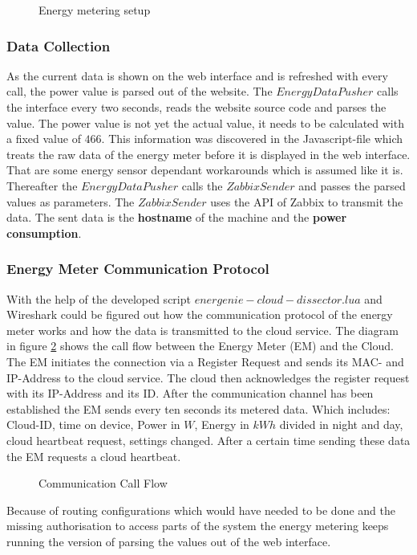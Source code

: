 \begin{figure}
	\centering
	\def\svgwidth{\columnwidth}
	
	\caption{Energy metering setup}
	\label{fig:energyMeteringSetup}
\end{figure}

\subsubsection{Data Collection}
As the current data is shown on the web interface and is refreshed with every call, the power value is parsed out of the website. The $ EnergyDataPusher $ calls the interface every two seconds, reads the website source code and parses the value. The power value is not yet the actual value, it needs to be calculated with a fixed value of $ 466 $. This information was discovered in the Javascript-file which treats the raw data of the energy meter before it is displayed in the web interface. That are some energy sensor dependant workarounds which is assumed like it is. Thereafter the $ EnergyDataPusher $ calls the $ ZabbixSender $ and passes the parsed values as parameters. The $ ZabbixSender $ uses the API of Zabbix to transmit the data. The sent data is the \textbf{hostname} of the machine and the \textbf{power consumption}.

\subsubsection{Energy Meter Communication Protocol}
With the help of the developed script $ energenie-cloud-dissector.lua $ and Wireshark could be figured out how the communication protocol of the energy meter works and how the data is transmitted to the cloud service. The diagram in figure \ref{fig:energyCommunicationProtocol} shows the call flow between the Energy Meter (EM) and the Cloud. The EM initiates the connection via a Register Request and sends its MAC- and IP-Address to the cloud service. The cloud then acknowledges the register request with its IP-Address and its ID. After the communication channel has been established the EM sends every ten seconds its metered data. Which includes: Cloud-ID, time on device, Power in $ W $, Energy in $ kWh $ divided in night and day, cloud heartbeat request, settings changed. After a certain time sending these data the EM requests a cloud heartbeat.

\begin{figure}
	\centering
	\def\svgwidth{\columnwidth}
	
	\caption{Communication Call Flow}
	\label{fig:energyCommunicationProtocol}
\end{figure}

Because of routing configurations which would have needed to be done and the missing authorisation to access parts of the system the energy metering keeps running the version of parsing the values out of the web interface.







